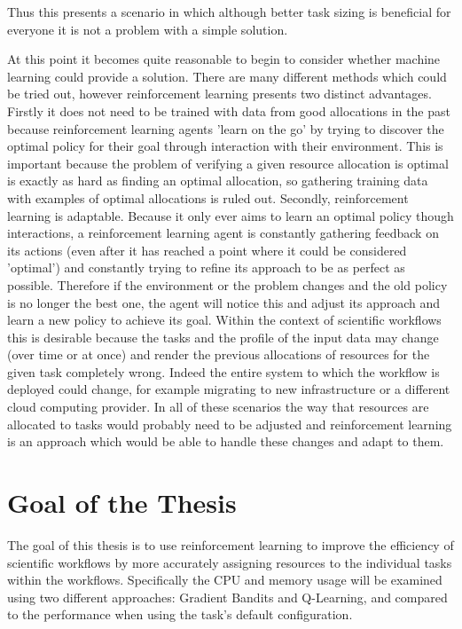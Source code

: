 Thus this presents a scenario in which although better task sizing is beneficial for everyone it is not a problem with a simple solution.

At this point it becomes quite reasonable to begin to consider whether machine learning could provide a solution. There are many different methods which could be tried out, however reinforcement learning presents two distinct advantages. Firstly it does not need to be trained with data from good allocations in the past because reinforcement learning agents 'learn on the go' by trying to discover the optimal policy for their goal through interaction with their environment. This is important because the problem of verifying a given resource allocation is optimal is exactly as hard as finding an optimal allocation, so gathering training data with examples of optimal allocations is ruled out. Secondly, reinforcement learning is adaptable. Because it only ever aims to learn an optimal policy though interactions, a reinforcement learning agent is constantly gathering feedback on its actions (even after it has reached a point where it could be considered 'optimal') and constantly trying to refine its approach to be as perfect as possible. Therefore if the environment or the problem changes and the old policy is no longer the best one, the agent will notice this and adjust its approach and learn a new policy to achieve its goal. Within the context of scientific workflows this is desirable because the tasks and the profile of the input data may change (over time or at once) and render the previous allocations of resources for the given task completely wrong. Indeed the entire system to which the workflow is deployed could change, for example migrating to new infrastructure or a different cloud computing provider. In all of these scenarios the way that resources are allocated to tasks would probably need to be adjusted and reinforcement learning is an approach which would be able to handle these changes and adapt to them.


\section{Goal of the Thesis}
\label{sec:goal}

The goal of this thesis is to use reinforcement learning to improve the efficiency of scientific workflows by more accurately assigning resources to the individual tasks within the workflows. Specifically the CPU and memory usage will be examined using two different approaches: Gradient Bandits and Q-Learning, and compared to the performance when using the task's default configuration.

